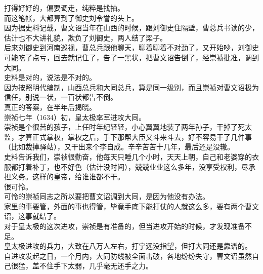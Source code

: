 \begin{multicols}{\theparacolNo}
打得好好的，偏要调走，纯粹是找抽。\\

而这笔帐，大都算到了御史刘令誉的头上。\\

因为据史料记载，曹文诏当年在山西的时候，跟刘御史住隔壁，曹总兵书读的少，估计也不大讲礼貌，欺负了刘御史，两人结了梁子。\\

后来刘御史到河南巡视，曹总兵跟他聊天，聊着聊着不对劲了，又开始吵，刘御史可能吃了点亏，回去就记住了，告了一黑状，把曹文诏告倒了，经崇祯批准，调到大同。\\

史料是对的，说法是不对的。\\

因为按照明代编制，山西总兵和大同总兵，算是同一级别，而且崇祯对曹文诏极为信任，别说一状，一百状都告不倒。\\

真正的答案，在半年后揭晓。\\

崇祯七年（1634）初，皇太极率军进攻大同。\\

崇祯是个很苦的孩子，上任时年纪轻轻，小心翼翼地装了两年孙子，干掉了死太监，才算正式掌权，掌权之后，手下那帮大臣又斗来斗去，好不容易干了几件事（比如裁掉驿站），又干出来个李自成。辛辛苦苦十几年，最后还是没辙。\\

史料告诉我们，崇祯很勤奋，他每天只睡几个小时，天天上朝，自己和老婆穿的衣服都打着补丁，也不好色（估计没时间），兢兢业业这么多年，没享受权利，尽承担义务。这样的皇帝，给谁谁都不干。\\

很可怜。\\

可怜的崇祯同志之所以要把曹文诏调到大同，是因为他没有办法。\\

家里的事要管，外面的事也得管，毕竟手底下能打仗的人就这么多，要有两个曹文诏，这事就结了。\\

对于皇太极的这次进攻，崇祯是有准备的，但当进攻开始的时候，才发现准备不足。\\

皇太极进攻的兵力，大致在八万人左右，打宁远没指望，但打大同还是靠谱的。\\

自进攻发起之日，一个月内，大同防线被全面击破，各地纷纷失守，曹文诏虽然自己很猛，盖不住手下太弱，几乎毫无还手之力。\\


\end{multicols}
